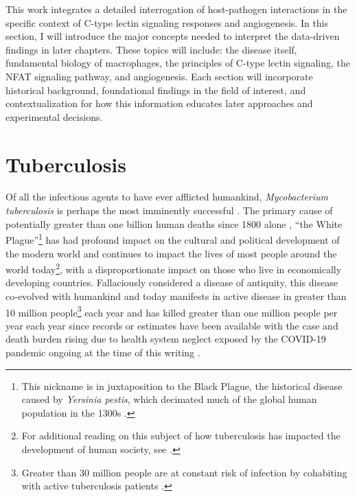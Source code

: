 This work integrates a detailed interrogation of host\hyp{}pathogen interactions in the specific context of C\hyp{}type lectin signaling responses and angiogenesis. In this section, I will introduce the major concepts needed to interpret the data\hyp{}driven findings in later chapters. These topics will include: the disease itself, fundamental biology of macrophages, the principles of C\hyp{}type lectin signaling, the NFAT signaling pathway, and angiogenesis. Each section will incorporate historical background, foundational findings in the field of interest, and contextualization for how this information educates later approaches and experimental decisions.

\section{Tuberculosis}\label{tuberculosis}

Of all the infectious agents to have ever afflicted humankind, \textit{Mycobacterium tuberculosis} is perhaps the most imminently successful \citep{Barberis2017}. The primary cause of potentially greater than one billion human deaths since 1800 alone \citep{Paulson2013, Murray2004}, ``the White Plague''\footnote{This nickname is in juxtaposition to the Black Plague, the historical disease caused by \textit{Yersinia pestis}, which decimated much of the global human population in the 1300s \citep{Perry1997}.} has had profound impact on the cultural and political development of the modern world and continues to impact the lives of most people around the world today\footnote{For additional reading on this subject of how tuberculosis has impacted the development of human society, see \citep{Chalke1962, Dubos1987}.}, with a disproportionate impact on those who live in economically developing countries. Fallaciously considered a disease of antiquity, this disease co\hyp{}evolved with humankind \citep{Hershkovitz2015} and today manifests in active disease in greater than 10 million people\footnote{Greater than 30 million people are at constant risk of infection by cohabiting with active tuberculosis patients \citep{Ross2021}.} each year and has killed greater than one million people per year each year since records or estimates have been available \citep{WHO2021, Saleem2013} with the case and death burden rising due to health system neglect exposed by the COVID\hyp{}19 pandemic ongoing at the time of this writing \citep{Pai2022}. 


